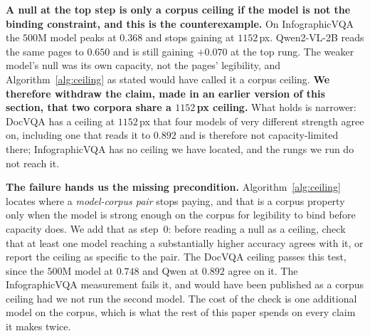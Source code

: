 \documentclass[10pt,twocolumn]{article}
\theoremstyle{plain}
\begin{document}
\begin{table}[t]
\centering\small
\setlength{\tabcolsep}{4pt}
\caption{The same procedure on two corpora and, on the second, two models. The
$500$M top steps are tight nulls ($[-0.024,+0.022]$ and $[-0.044,+0.028]$); the
stronger model's is a gain of $+0.070\ [+0.032,+0.110]$, so on
InfographicVQA the ceiling lies above the highest rung we run.}
\label{tab:corpora}
\end{table}

\textbf{A null at the top step is only a corpus ceiling if the model is not the
binding constraint, and this is the counterexample.} On InfographicVQA the
$500$M model peaks at $0.368$ and stops gaining at $1152$\,px. Qwen2-VL-2B
reads the same pages to $0.650$ and is still gaining $+0.070$ at the top rung.
The weaker model's null was its own capacity, not the pages' legibility, and
Algorithm~\ref{alg:ceiling} as stated would have called it a corpus ceiling. \textbf{We
therefore withdraw the claim, made in an earlier version of this section, that
two corpora share a $1152$\,px ceiling.} What holds is narrower: DocVQA has a
ceiling at $1152$\,px that four models of very different strength agree on,
including one that reads it to $0.892$ and is therefore not capacity-limited
there; InfographicVQA has no ceiling we have located, and the rungs we run do
not reach it.

\textbf{The failure hands us the missing precondition.} Algorithm~\ref{alg:ceiling} locates
where a \emph{model-corpus pair} stops paying, and that is a corpus property
only when the model is strong enough on the corpus for legibility to bind
before capacity does. We add that as step~0: before reading a null as a
ceiling, check that at least one model reaching a substantially higher accuracy
agrees with it, or report the ceiling as specific to the pair. The DocVQA
ceiling passes this test, since the $500$M model at $0.748$ and Qwen at
$0.892$ agree on it. The InfographicVQA measurement fails it, and would have
been published as a corpus ceiling had we not run the second model. The cost of
the check is one additional model on the corpus, which is what the rest of this
paper spends on every claim it makes twice.
\end{document}
